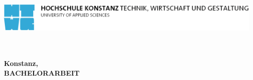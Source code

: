 
\begin{titlepage}

\vspace*{-3.5cm}

\begin{flushleft}
\hspace*{-1cm} \includegraphics[width=15.7cm]{titlepages/htwg-logo}
\end{flushleft}

\vspace{2.5cm}

\begin{center}
	\huge{
		\textbf{\thema} \\[4cm]
	}
	\Large{
		\textbf{\autor}} \\[4cm]
	\large{
		\textbf{Konstanz, \abgabedatum} \\[1cm]
	}
	\Huge{
		\textbf{{\sf BACHELORARBEIT}}
	}
\end{center}

\end{titlepage}
